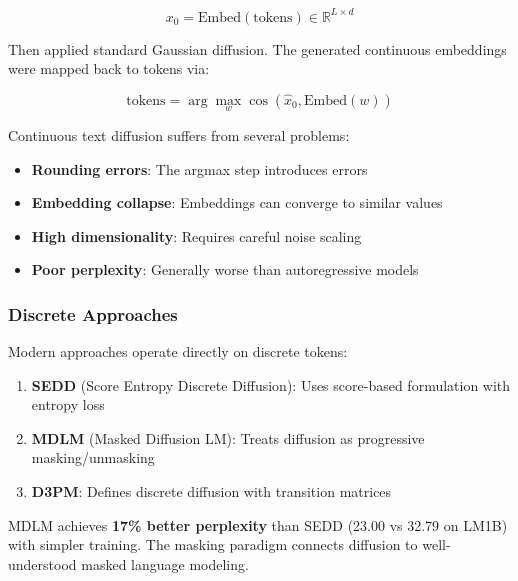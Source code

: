 \documentclass[11pt,a4paper]{article}
\begin{document}
\begin{equation}
    x_0 = \text{Embed}(\text{tokens}) \in \mathbb{R}^{L \times d}
\end{equation}

Then applied standard Gaussian diffusion. The generated continuous embeddings were mapped back to tokens via:

\begin{equation}
    \text{tokens} = \arg\max_w \cos(\hat{x}_0, \text{Embed}(w))
\end{equation}

\begin{warning}
Continuous text diffusion suffers from several problems:
\begin{itemize}
    \item \textbf{Rounding errors}: The argmax step introduces errors
    \item \textbf{Embedding collapse}: Embeddings can converge to similar values
    \item \textbf{High dimensionality}: Requires careful noise scaling
    \item \textbf{Poor perplexity}: Generally worse than autoregressive models
\end{itemize}
\end{warning}

\subsubsection{Discrete Approaches}

Modern approaches operate directly on discrete tokens:

\begin{enumerate}
    \item \textbf{SEDD} (Score Entropy Discrete Diffusion): Uses score-based formulation with entropy loss
    \item \textbf{MDLM} (Masked Diffusion LM): Treats diffusion as progressive masking/unmasking
    \item \textbf{D3PM}: Defines discrete diffusion with transition matrices
\end{enumerate}

\begin{keyinsight}
MDLM achieves \textbf{17\% better perplexity} than SEDD (23.00 vs 32.79 on LM1B) with simpler training. The masking paradigm connects diffusion to well-understood masked language modeling.
\end{keyinsight}
\end{document}
